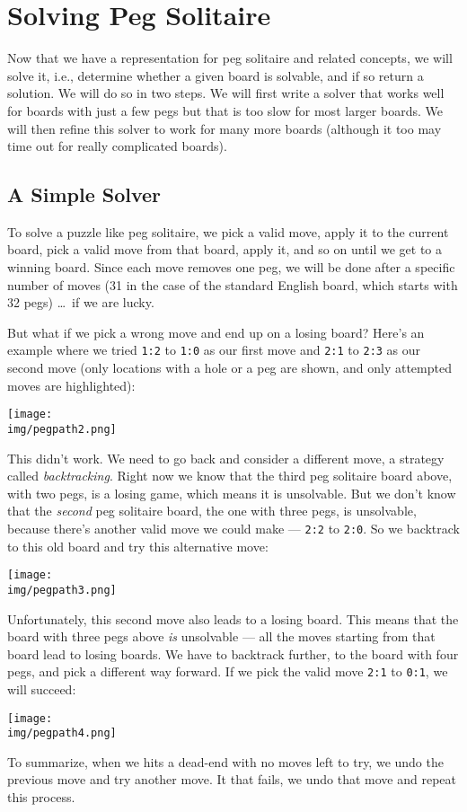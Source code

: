 \documentclass[12pt]{exam}
\begin{document}
\section{Solving Peg Solitaire}

Now that we have a representation for peg solitaire and related
concepts, we will solve it, i.e., determine whether a given board is
solvable, and if so return a solution.  We will do so in two steps.
We will first write a solver that works well for boards with just a
few pegs but that is too slow for most larger boards.  We will then
refine this solver to work for many more boards (although it too may
time out for really complicated boards).


\subsection{A Simple Solver}

To solve a puzzle like peg solitaire, we pick a valid move, apply it
to the current board, pick a valid move from that board, apply it, and
so on until we get to a winning board.  Since each move removes one
peg, we will be done after a specific number of moves (31 in the case
of the standard English board, which starts with 32 pegs) \ldots~if we
are lucky.

But what if we pick a wrong move and end up on a losing board?  Here's
an example where we tried \lstinline'1:2' to \lstinline'1:0' as our
first move and \lstinline'2:1' to \lstinline'2:3' as our second move
(only locations with a hole or a peg are shown, and only attempted
moves are highlighted):
\begin{center}
  \texttt{[image: \\img/pegpath2.png]}
\end{center}
This didn't work.  We need to go back and consider a different move, a
strategy called \emph{backtracking}.  Right now we know that the third
peg solitaire board above, with two pegs, is a losing game, which
means it is unsolvable.  But we don't know that the \emph{second} peg
solitaire board, the one with three pegs, is unsolvable, because
there's another valid move we could make --- \lstinline'2:2' to
\lstinline'2:0'. So we backtrack to this old board and try this
alternative move:
\begin{center}
\texttt{[image: \\img/pegpath3.png]}
\end{center}
Unfortunately, this second move also leads to a losing board. This
means that the board with three pegs above \emph{is} unsolvable ---
all the moves starting from that board lead to losing boards.  We have
to backtrack further, to the board with four pegs, and pick a
different way forward. If we pick the valid move \lstinline'2:1' to
\lstinline'0:1', we will succeed:
\begin{center}
\hspace*{-4em}%
\texttt{[image: \\img/pegpath4.png]}
\end{center}
To summarize, when we hits a dead-end with no moves left to try, we
undo the previous move and try another move.  It that fails, we
undo that move and repeat this process.
\end{document}

